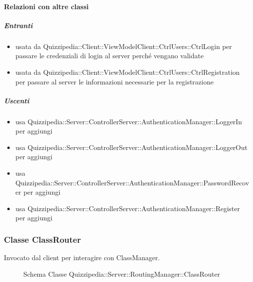 \paragraph{Relazioni con altre classi}
\subparagraph{Entranti}
\begin{itemize}
\item usata da Quizzipedia::Client::ViewModelClient::CtrlUsers::CtrlLogin per passare le credenziali di login al server perché vengano validate
\item usata da Quizzipedia::Client::ViewModelClient::CtrlUsers::CtrlRegistration per passare al server le informazioni necessarie per la registrazione
\end{itemize}
\subparagraph{Uscenti}
\begin{itemize}
\item usa Quizzipedia::Server::ControllerServer::AuthenticationManager::LoggerIn per aggiungi
\item usa Quizzipedia::Server::ControllerServer::AuthenticationManager::LoggerOut per aggiungi
\item usa Quizzipedia::Server::ControllerServer::AuthenticationManager::PasswordRecover per aggiungi
\item usa Quizzipedia::Server::ControllerServer::AuthenticationManager::Register per aggiungi
\end{itemize}
\subsubsection{Classe ClassRouter}
Invocato dal client per interagire con ClassManager.
\begin{figure}[H]
\centering
\noindent{}
\caption[Schema Classe ClassRouter]{Schema Classe Quizzipedia::Server::RoutingManager::ClassRouter}
\end{figure}
